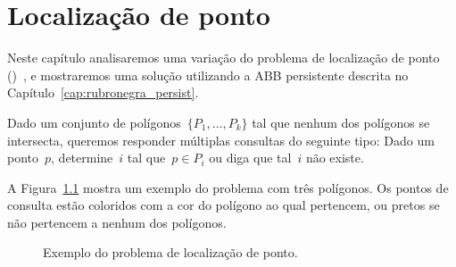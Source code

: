 \documentclass[../../main.tex]{subfiles}
\begin{document}
\chapter{Localização de ponto} \label{cap:pl_persist}

Neste capítulo analisaremos uma variação do problema de localização de ponto ()~\cite{SarnakT1986}, e mostraremos uma solução utilizando a ABB persistente descrita no Capítulo~\ref{cap:rubronegra_persist}.

Dado um conjunto de polígonos~${\{P_1, \ldots, P_k\}}$ tal que nenhum dos polígonos se intersecta, queremos responder múltiplas consultas do seguinte tipo: Dado um ponto~$p$, determine~$i$ tal que~${p \in P_i}$ ou diga que tal~$i$ não existe.

A Figura~\ref{fig:exemplo_pl} mostra um exemplo do problema com três polígonos. Os pontos de consulta estão coloridos com a cor do polígono ao qual pertencem, ou pretos se não pertencem a nenhum dos polígonos.

\begin{figure}[h]
\centering
{}
\caption{Exemplo do problema de localização de ponto.} \label{fig:exemplo_pl}
\end{figure}
\end{document}
